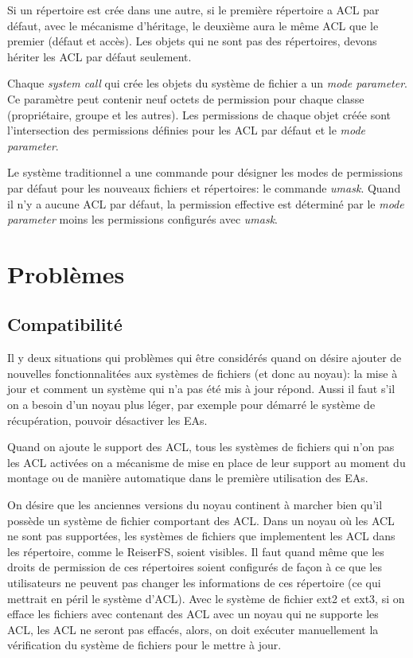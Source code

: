 \documentclass{article}
\begin{document}
Si un répertoire est crée dans une autre, si le première répertoire a ACL par défaut, avec le mécanisme d'héritage, le deuxième aura le même ACL que le premier (défaut  et accès). Les objets qui ne sont pas des répertoires, devons hériter les ACL par défaut seulement.
 
Chaque \emph{system call} qui crée les objets du système de fichier a un \emph{mode parameter}. Ce paramètre peut contenir neuf octets de permission pour chaque classe (propriétaire, groupe et les autres). Les permissions de chaque objet créée sont l'intersection des permissions définies pour les ACL par défaut et le \emph{mode parameter}.
 
Le système traditionnel a une commande pour désigner les modes de permissions par défaut pour les nouveaux fichiers et répertoires: le commande \emph{umask}. Quand il n'y a aucune ACL par défaut, la permission effective est déterminé par le \emph{mode parameter} moins les permissions configurés avec \emph{umask}.

\section*{Problèmes}

\subsection*{Compatibilité}

Il y deux situations qui problèmes qui être considérés quand on désire ajouter de nouvelles fonctionnalitées aux systèmes de fichiers (et donc au noyau): la mise à jour et comment un système qui n'a pas été mis à jour répond.
Aussi il faut s'il on a besoin d'un noyau plus léger, par exemple pour démarré le système de récupération, pouvoir désactiver les EAs. 

Quand on ajoute le support des ACL, tous les systèmes de fichiers qui n'on pas les ACL activées on a mécanisme de mise en place de leur support au moment du montage ou de manière automatique dans le première utilisation des EAs. 

On désire que les anciennes versions du noyau continent à marcher bien qu'il possède un système de fichier comportant des ACL. Dans un noyau où les ACL ne sont pas supportées, les systèmes de fichiers que implementent les ACL dans les répertoire, comme le ReiserFS, soient visibles. Il faut quand même que les droits de permission de ces répertoires soient configurés de façon à ce que les utilisateurs ne peuvent pas changer les informations de ces répertoire (ce qui mettrait en péril le système d'ACL). Avec le système de fichier ext2 et ext3, si on efface les fichiers avec contenant des ACL avec un noyau qui ne supporte les ACL, les ACL ne seront pas effacés, alors, on doit exécuter manuellement la vérification du système de fichiers pour le mettre à jour. 
 	
\end{document}

